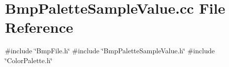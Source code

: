 \section{Bmp\+Palette\+Sample\+Value.\+cc File Reference}
\label{BmpPaletteSampleValue_8cc}
{\ttfamily \#include \char`\"{}Bmp\+File.\+h\char`\"{}}\newline
{\ttfamily \#include \char`\"{}Bmp\+Palette\+Sample\+Value.\+h\char`\"{}}\newline
{\ttfamily \#include \char`\"{}Color\+Palette.\+h\char`\"{}}\newline
